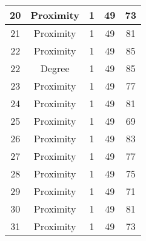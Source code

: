 \documentclass[results.tex]{subfiles}
\begin{document}
\begin{center}
\begin{tabular}{| c || c | c | c | c |}
            \hline
            20                      & Proximity                    & 1                      & 49                      & 73                   \\
            \hline
            21                      & Proximity                    & 1                      & 49                      & 81                   \\
            \hline
            22                      & Proximity                    & 1                      & 49                      & 85                   \\
            \hline
            22                      & Degree                       & 1                      & 49                      & 85                   \\
            \hline
            23                      & Proximity                    & 1                      & 49                      & 77                   \\
            \hline
            24                      & Proximity                    & 1                      & 49                      & 81                   \\
            \hline
            25                      & Proximity                    & 1                      & 49                      & 69                   \\
            \hline
            26                      & Proximity                    & 1                      & 49                      & 83                   \\
            \hline
            27                      & Proximity                    & 1                      & 49                      & 77                   \\
            \hline
            28                      & Proximity                    & 1                      & 49                      & 75                   \\
            \hline
            29                      & Proximity                    & 1                      & 49                      & 71                   \\
            \hline
            30                      & Proximity                    & 1                      & 49                      & 81                   \\
            \hline
            31                      & Proximity                    & 1                      & 49                      & 73                   \\

\end{tabular}
\end{center}
\end{document}
